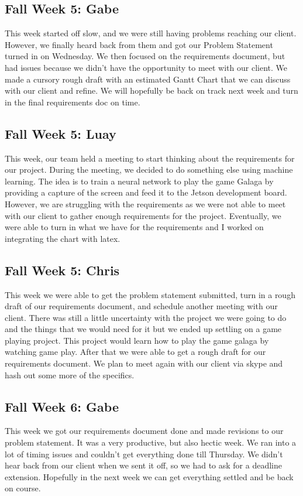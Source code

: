 \documentclass[onecolumn, draftclsnofoot,10pt, compsoc]{IEEEtran}
\begin{document}
\subsection{Fall Week 5: Gabe}
This week started off slow, and we were still having problems reaching our client. However, we finally heard back from them and got our Problem Statement turned in on Wednesday. We then focused on the requirements document, but had issues because we didn't have the opportunity to meet with our client. We made a cursory rough draft with an estimated Gantt Chart that we can discuss with our client and refine. We will hopefully be back on track next week and turn in the final requirements doc on time.
\subsection{Fall Week 5: Luay}
This week, our team held a meeting to start thinking about the requirements for our project. During the meeting, we decided to do something else using machine learning. The idea is to train a neural network to play the game Galaga by providing a capture of the screen and feed it to the Jetson development board. However, we are struggling with the requirements as we were not able to meet with our client to gather enough requirements for the project. Eventually, we were able to turn in what we have for the requirements and I worked on integrating the chart with latex.
\subsection{Fall Week 5: Chris}
This week we were able to get the problem statement submitted, turn in a rough draft of our requirements document, and schedule another meeting with our client. There was still a little uncertainty with the project we were going to do and the things that we would need for it but we ended up settling on a game playing project. This project would learn how to play the game galaga by watching game play. After that we were able to get a rough draft for our requirements document. We plan to meet again with our client via skype and hash out some more of the specifics.
\subsection{Fall Week 6: Gabe}
This week we got our requirements document done and made revisions to our problem statement. It was a very productive, but also hectic week. We ran into a lot of timing issues and couldn't get everything done till Thursday. We didn't hear back from our client when we sent it off, so we had to ask for a deadline extension. Hopefully in the next week we can get everything settled and be back on course.
\end{document}
